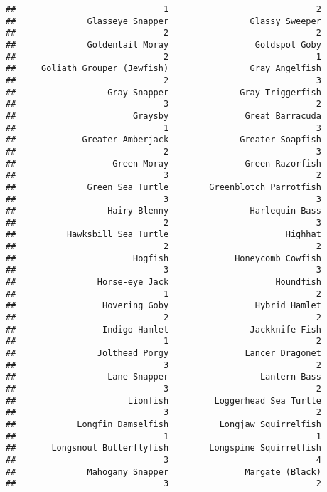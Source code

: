 \documentclass[
]{article}
\begin{document}
\begin{verbatim}
##                             1                             2 
##              Glasseye Snapper                Glassy Sweeper 
##                             2                             2 
##              Goldentail Moray                 Goldspot Goby 
##                             2                             1 
##     Goliath Grouper (Jewfish)                Gray Angelfish 
##                             2                             3 
##                  Gray Snapper              Gray Triggerfish 
##                             3                             2 
##                       Graysby               Great Barracuda 
##                             1                             3 
##             Greater Amberjack              Greater Soapfish 
##                             2                             3 
##                   Green Moray               Green Razorfish 
##                             3                             2 
##              Green Sea Turtle        Greenblotch Parrotfish 
##                             3                             3 
##                  Hairy Blenny                Harlequin Bass 
##                             2                             3 
##          Hawksbill Sea Turtle                       Highhat 
##                             2                             2 
##                       Hogfish             Honeycomb Cowfish 
##                             3                             3 
##                Horse-eye Jack                     Houndfish 
##                             1                             2 
##                 Hovering Goby                 Hybrid Hamlet 
##                             2                             2 
##                 Indigo Hamlet                Jackknife Fish 
##                             1                             2 
##                Jolthead Porgy               Lancer Dragonet 
##                             3                             2 
##                  Lane Snapper                  Lantern Bass 
##                             3                             2 
##                      Lionfish         Loggerhead Sea Turtle 
##                             3                             2 
##            Longfin Damselfish          Longjaw Squirrelfish 
##                             1                             1 
##       Longsnout Butterflyfish        Longspine Squirrelfish 
##                             3                             4 
##              Mahogany Snapper               Margate (Black) 
##                             3                             2 

\end{verbatim}
\end{document}

